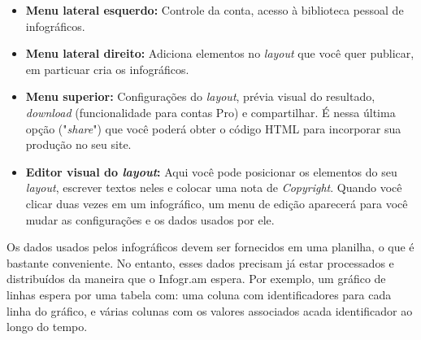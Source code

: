 \documentclass[12pt,onecolumn]{article}
\begin{document}
  \begin{itemize}
    \item
      \textbf{Menu lateral esquerdo:}
      Controle da conta, acesso à biblioteca pessoal de
      infográficos.
    \item
      \textbf{Menu lateral direito:}
      Adiciona elementos no \textit{layout} que você quer
      publicar, em particuar cria os infográficos.
    \item
      \textbf{Menu superior:}
      Configurações do \textit{layout}, prévia visual do resultado,
      \textit{download} (funcionalidade para contas Pro) e compartilhar. É nessa
      última opção ("\textit{share}") que você poderá obter o código HTML para
      incorporar sua produção no seu site.
    \item
      \textbf{Editor visual do \textit{layout}:}
      Aqui você pode posicionar os elementos do seu \textit{layout}, escrever
      textos neles e colocar uma nota de \textit{Copyright}. Quando você clicar
      duas vezes em um infográfico, um menu de edição aparecerá para você mudar
      as configurações e os dados usados por ele.
  \end{itemize}
  
  Os dados usados pelos infográficos devem ser fornecidos em uma planilha, o que
  é bastante conveniente. No entanto, esses dados precisam já estar processados
  e distribuídos da maneira que o Infogr.am espera. Por exemplo, um gráfico de
  linhas espera por uma tabela com: uma coluna com identificadores para cada
  linha do gráfico, e várias colunas com os valores associados acada
  identificador ao longo do tempo.
  
\end{document}
